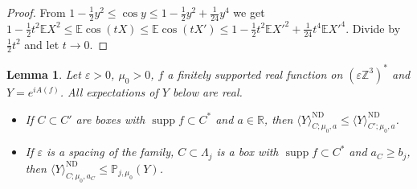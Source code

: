 \documentclass[11pt]{amsart}
\theoremstyle{plain}
\newtheorem{lemma}[theorem]{Lemma}
\theoremstyle{definition}
\theoremstyle{remark}
\numberwithin{equation}{section}
\newcommand{\R}{\mathbb{R}}
\newcommand{\Z}{\mathbb{Z}}
\newcommand{\eps}{\varepsilon}
\newcommand{\ev}[1]{\langle #1\rangle}
\DeclareMathOperator{\supp}{supp}
\begin{document}
\begin{proof}
From $1-\frac12y^2\le\cos y\le1-\frac12y^2+\frac1{24}y^4$ we get $1-\frac12t^2\mathbb E X^2\le\mathbb E\cos(tX)\le\mathbb E\cos(tX')\le1-\frac12t^2\mathbb E X'^2+\frac1{24}t^4\mathbb E X'^4$. Divide by $\frac12t^2$ and let $t\to0$.
\end{proof}

\begin{lemma}\label{lem:tor-order}
Let $\eps>0$, $\mu_0>0$, $f$ a finitely supported real function on $(\eps\Z^3)^*$ and $Y=e^{iA(f)}$. All expectations of $Y$ below are real.
\begin{itemize}
\item[(a)] If $C\subset C'$ are boxes with $\supp f\subset C^*$ and $a\in\R$, then $\ev Y^{\mathrm{ND}}_{C;\mu_0,a}\le\ev Y^{\mathrm{ND}}_{C';\mu_0,a}$.
\item[(b)] If $\eps$ is a spacing of the family, $C\subset\Lambda_j$ is a box with $\supp f\subset C^*$ and $a_C\ge b_j$, then $\ev Y^{\mathrm{ND}}_{C;\mu_0,a_C}\le\mathbb P_{j,\mu_0}(Y)$.
\end{itemize}
\end{lemma}
\end{document}
